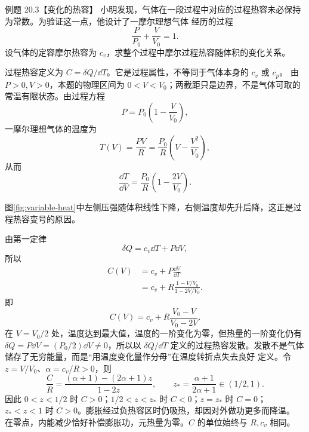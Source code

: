 \begin{origexamplebox}{例题 20.3【变化的热容】}
小明发现，气体在一段过程中对应的过程热容未必保持为常数。为验证这一点，他设计了一摩尔理想气体
经历的过程
\begin{equation*}
  \frac{P}{P_0}+\frac{V}{V_0}=1.
\end{equation*}
设气体的定容摩尔热容为 $c_v$，求整个过程中摩尔过程热容随体积的变化关系。
\end{origexamplebox}

\begin{xesolution}
过程热容定义为 $C=\delta Q/\dd T$。它是过程属性，不等同于气体本身的 $c_v$ 或 $c_p$。
由 $P>0,V>0$，本题的物理区间为 $0<V<V_0$；两截距只是边界，不是气体可取的常温有限状态。由过程方程
\begin{equation*}
  P=P_0\left(1-\frac{V}{V_0}\right),
\end{equation*}
一摩尔理想气体的温度为
\begin{equation*}
  T(V)=\frac{PV}{R}
  =\frac{P_0}{R}\left(V-\frac{V^2}{V_0}\right),
\end{equation*}
从而
\begin{equation*}
  \frac{\dd T}{\dd V}=\frac{P_0}{R}\left(1-\frac{2V}{V_0}\right).
\end{equation*}

\variableHeatCapacityDiagram
{}\label{fig:variable-heat}
图\ref{fig:variable-heat}中左侧压强随体积线性下降，右侧温度却先升后降，这正是过程热容变号的原因。

由第一定律
\begin{equation*}
  \delta Q=c_v\dd T+P\dd V,
\end{equation*}
所以
\begin{align*}
  C(V)
  &=c_v+P\frac{\dd V}{\dd T}\\
  &=c_v+R\frac{1-V/V_0}{1-2V/V_0}.
\end{align*}
即
\begin{equation}
  \boxed{C(V)=c_v+R\frac{V_0-V}{V_0-2V}}.
\end{equation}
在 $V=V_0/2$ 处，温度达到最大值，温度的一阶变化为零，但热量的一阶变化仍有
$\delta Q=P\dd V=(P_0/2)\dd V\ne0$，所以以 $\delta Q/\dd T$
定义的过程热容发散。发散不是气体储存了无穷能量，而是“用温度变化量作分母”在温度转折点失去良好
定义。令 $z=V/V_0$、$\alpha=c_v/R>0$，则
\[
 \frac{C}{R}=\frac{(\alpha+1)-(2\alpha+1)z}{1-2z},\qquad
 z_* =\frac{\alpha+1}{2\alpha+1}\in(1/2,1).
\]
因此 $0<z<1/2$ 时 $C>0$；$1/2<z<z_*$ 时 $C<0$；$z=z_*$ 时 $C=0$；
$z_*<z<1$ 时 $C>0$。膨胀经过负热容区时仍吸热，却因对外做功更多而降温。
在零点，内能减少恰好补偿膨胀功，元热量为零。$C$ 的单位始终与 $R,c_v$ 相同。
\end{xesolution}

